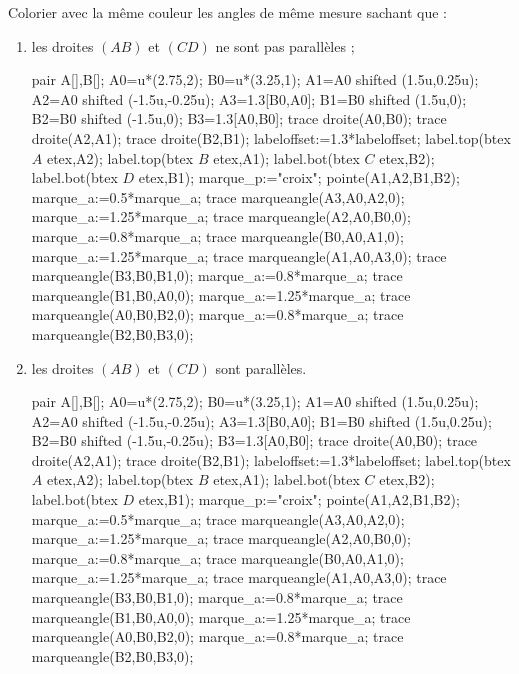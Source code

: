 \begin{exercice*}
    Colorier avec la même couleur les angles de même mesure sachant que :
    \begin{enumerate}
      \item les droites $(AB)$ et $(CD)$ ne sont pas parallèles ;
      \begin{Geometrie}[CoinHD={(5.5u,3u)}]
         pair A[],B[];
         A0=u*(2.75,2);
         B0=u*(3.25,1);
         A1=A0 shifted (1.5u,0.25u);
         A2=A0 shifted (-1.5u,-0.25u);
         A3=1.3[B0,A0];
         B1=B0 shifted (1.5u,0);
         B2=B0 shifted (-1.5u,0);
         B3=1.3[A0,B0];
         trace droite(A0,B0);
         trace droite(A2,A1);
         trace droite(B2,B1);
         labeloffset:=1.3*labeloffset;
         label.top(btex $A$ etex,A2);
         label.top(btex $B$ etex,A1);
         label.bot(btex $C$ etex,B2);
         label.bot(btex $D$ etex,B1);         
         marque_p:="croix";
         pointe(A1,A2,B1,B2);
         marque_a:=0.5*marque_a;
         trace marqueangle(A3,A0,A2,0);
         marque_a:=1.25*marque_a;
         trace marqueangle(A2,A0,B0,0);
         marque_a:=0.8*marque_a;
         trace marqueangle(B0,A0,A1,0);
         marque_a:=1.25*marque_a;
         trace marqueangle(A1,A0,A3,0);
         trace marqueangle(B3,B0,B1,0);
         marque_a:=0.8*marque_a;
         trace marqueangle(B1,B0,A0,0);
         marque_a:=1.25*marque_a;
         trace marqueangle(A0,B0,B2,0);
         marque_a:=0.8*marque_a;
         trace marqueangle(B2,B0,B3,0);
     \end{Geometrie}
      \item les droites $(AB)$ et $(CD)$ sont parallèles.
      \begin{Geometrie}[CoinHD={(5.5u,3u)}]
         pair A[],B[];
         A0=u*(2.75,2);
         B0=u*(3.25,1);
         A1=A0 shifted (1.5u,0.25u);
         A2=A0 shifted (-1.5u,-0.25u);
         A3=1.3[B0,A0];
         B1=B0 shifted (1.5u,0.25u);
         B2=B0 shifted (-1.5u,-0.25u);
         B3=1.3[A0,B0];
         trace droite(A0,B0);
         trace droite(A2,A1);
         trace droite(B2,B1);
         labeloffset:=1.3*labeloffset;
         label.top(btex $A$ etex,A2);
         label.top(btex $B$ etex,A1);
         label.bot(btex $C$ etex,B2);
         label.bot(btex $D$ etex,B1);         
         marque_p:="croix";
         pointe(A1,A2,B1,B2);
         marque_a:=0.5*marque_a;
         trace marqueangle(A3,A0,A2,0);
         marque_a:=1.25*marque_a;
         trace marqueangle(A2,A0,B0,0);
         marque_a:=0.8*marque_a;
         trace marqueangle(B0,A0,A1,0);
         marque_a:=1.25*marque_a;
         trace marqueangle(A1,A0,A3,0);
         trace marqueangle(B3,B0,B1,0);
         marque_a:=0.8*marque_a;
         trace marqueangle(B1,B0,A0,0);
         marque_a:=1.25*marque_a;
         trace marqueangle(A0,B0,B2,0);
         marque_a:=0.8*marque_a;
         trace marqueangle(B2,B0,B3,0);
     \end{Geometrie}
    \end{enumerate}
 \end{exercice*} 
